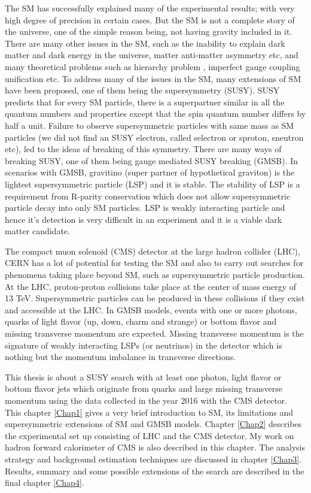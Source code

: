 The SM has successfully explained many of the experimental results; with very high degree of precision in certain cases. But the SM is not a complete story of the universe, one of the simple reason being, not having gravity included in it. There are many other issues in the SM, such as the inability to explain dark matter \cite{Zwicky:1933gu,Clowe:2006eq} and dark energy \cite{Riess:1998cb} in the universe, matter anti-matter asymmetry \cite{doi:10.1146/annurev.aa.14.090176.002011,Canetti:2012zc} etc, and many theoretical problems such as hierarchy problem \cite{tHooft:1979rat}, imperfect gauge coupling unification etc. To address many of the issues in the SM, many extensions of SM have been proposed, one of them being the supersymmetry (SUSY). SUSY predicts that for every SM particle, there is a superpartner similar in all the quantum numbers and properties except that the spin quantum number differs by half a unit. Failure to observe supersymmetric particles with same mass as SM particles (we did not find an SUSY electron, called selectron or sproton, sneutron etc), led to the ideas of breaking of this symmetry. There are many ways of breaking SUSY, one of them being gauge mediated SUSY breaking (GMSB). In scenarios with GMSB, gravitino (super partner of hypothetical graviton) is the lightest supersymmetric particle (LSP) and it is stable. The stability of LSP is a requirement from R-parity conservation which does not allow supersymmetric particle decay into only SM particles. LSP is weakly interacting particle and hence it's detection is very difficult in an experiment and it is a viable dark matter candidate.

The compact muon solenoid (CMS) detector at the large hadron collider (LHC), CERN has a lot of potential for testing the SM and also to carry out searches for phenomena taking place beyond SM, such as supersymmetric particle production. At the LHC, proton-proton collisions take place at the center of mass energy of 13 TeV. Supersymmetric particles can be produced in these collisions if they exist and accessible at the LHC. In GMSB models, events with one or more photons, quarks of light flavor (up, down, charm and strange) or bottom flavor and missing transverse momentum are expected. Missing transverse momentum is the signature of weakly interacting LSPs (or neutrinos) in the detector which is nothing but the momentum imbalance in transverse directions.

This thesis is about a SUSY search with at least one photon, light flavor  or bottom flavor jets which originate from quarks and large missing transverse momentum using the data collected in the year 2016 with the CMS detector. This chapter \ref{Chap1} gives a very brief introduction to SM, its limitations and supersymmetric extensions of SM and GMSB models. Chapter \ref{Chap2} describes the experimental set up consisting of LHC and the CMS detector. My work on hadron forward calorimeter of CMS is also described in this chapter.  The analysis strategy and background estimation techniques are discussed in chapter \ref{Chap3}. Results, summary and some possible extensions of the search are described in the final chapter \ref{Chap4}.


